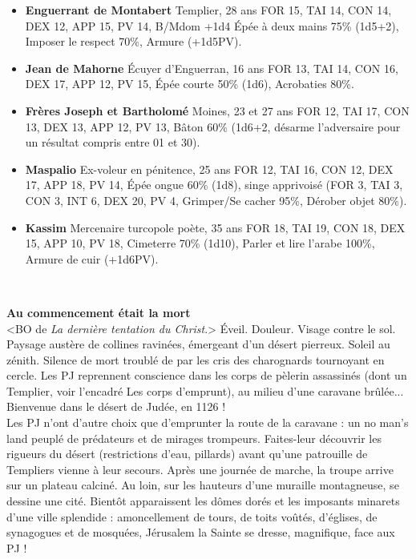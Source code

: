 \documentclass[11pt,twoside,a4paper]{book}
\begin{document}
\setlength\parindent{20pt}
\begin{itemize}
	\item \textbf{Enguerrant de Montabert} Templier, 28 ans FOR 15, TAI 14, CON 14, DEX 12, APP 15, PV 14, B/Mdom +1d4 {\'E}p{\'e}e {\`a} deux mains 75\% (1d5+2), Imposer le respect 70\%, Armure (+1d5PV).
	\item \textbf{Jean de Mahorne} {\'E}cuyer d'Enguerran, 16 ans FOR 13, TAI 14, CON 16, DEX 17, APP 12, PV 15, {\'E}p{\'e}e courte 50\% (1d6), Acrobaties 80\%.
	\item \textbf{Fr{\`e}res Joseph et Bartholom{\'e}} Moines, 23 et 27 ans FOR 12, TAI 17, CON 13, DEX 13, APP 12, PV 13, B{\^a}ton 60\% (1d6+2, d{\'e}sarme l'adversaire pour un r{\'e}sultat compris entre 01 et 30).
	\item \textbf{Maspalio} Ex-voleur en p{\'e}nitence, 25 ans FOR 12, TAI 16, CON 12, DEX 17, APP 18, PV 14, {\'E}p{\'e}e ongue 60\% (1d8), singe apprivois{\'e} (FOR 3, TAI 3, CON 3, INT 6, DEX 20, PV 4, Grimper/Se cacher 95\%, D{\'e}rober objet 80\%).
	\item \textbf{Kassim} Mercenaire turcopole po{\`e}te, 35 ans FOR 18, TAI 19, CON 18, DEX 15, APP 10, PV 18, Cimeterre 70\% (1d10), Parler et lire l'arabe 100\%, Armure de cuir (+1d6PV).
\end{itemize}~\\
\setlength\parindent{0pt}

\textbf{\large Au commencement {\'e}tait la mort}~\\

<BO de \emph{La derni{\`e}re tentation du Christ}.> {\'E}veil. Douleur. Visage contre le sol. Paysage aust{\`e}re de collines ravin{\'e}es, {\'e}mergeant d'un d{\'e}sert pierreux. Soleil au z{\'e}nith. Silence de mort troubl{\'e} de par les cris des charognards tournoyant en cercle. Les PJ reprennent conscience dans les corps de p{\`e}lerin assassin{\'e}s (dont un Templier, voir l'encadr{\'e} Les corps d'emprunt), au milieu d'une caravane br{\^u}l{\'e}e... Bienvenue dans le d{\'e}sert de Jud{\'e}e, en 1126 !~\\

Les PJ n'ont d'autre choix que d'emprunter la route de la caravane : un no man's land peupl{\'e} de pr{\'e}dateurs et de mirages trompeurs. Faites-leur d{\'e}couvrir les rigueurs du d{\'e}sert (restrictions d'eau, pillards) avant qu'une patrouille de Templiers vienne {\`a} leur secours. Apr{\`e}s une journ{\'e}e de marche, la troupe arrive sur un plateau calcin{\'e}. Au loin, sur les hauteurs d'une muraille montagneuse, se dessine une cit{\'e}. Bient{\^o}t apparaissent les d{\^o}mes dor{\'e}s et les imposants minarets d'une ville splendide : amoncellement de tours, de toits vo{\^u}t{\'e}s, d'{\'e}glises, de synagogues et de mosqu{\'e}es, J{\'e}rusalem la Sainte se dresse, magnifique, face aux PJ !~\\
\end{document}
